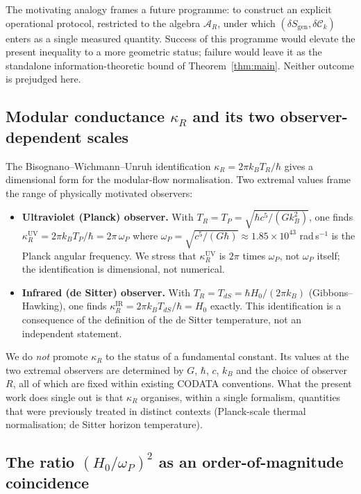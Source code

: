 \documentclass[aps,prd,superscriptaddress,nofootinbib,floatfix,10pt]{revtex4-2}
\theoremstyle{remark}
\newcommand{\Sgen}{S_{\mathrm{gen}}}
\newcommand{\kR}{\kappa_{R}}
\newcommand{\Ck}{\mathcal{C}_{k}}
\newcommand{\AR}{\mathcal{A}_{R}}
\begin{document}
The motivating analogy frames a future programme: to construct an
explicit operational protocol, restricted to the algebra $\AR$, under
which $(\delta\Sgen,\delta\Ck)$ enters as a single measured quantity.
Success of this programme would elevate the present inequality to a
more geometric status; failure would leave it as the standalone
information-theoretic bound of Theorem~\ref{thm:main}. Neither outcome
is prejudged here.

\subsection{Modular conductance $\kR$ and its two observer-dependent scales}
\label{sec:outlook:kappa}

The Bisognano--Wichmann--Unruh identification
$\kR = 2\pi k_{B} T_{R}/\hbar$ gives a dimensional form for the
modular-flow normalisation. Two extremal values frame the range of
physically motivated observers:

\begin{itemize}[leftmargin=2em,itemsep=4pt]
 \item \textbf{Ultraviolet (Planck) observer.} With $T_{R}=T_{P}=
   \sqrt{\hbar c^{5}/(G k_{B}^{2})}$, one finds
   $\kR^{\mathrm{UV}} = 2\pi k_{B} T_{P}/\hbar = 2\pi\,\omega_{P}$
   where $\omega_{P}=\sqrt{c^{5}/(G\hbar)}\approx 1.85\times 10^{43}$
   rad\,s$^{-1}$ is the Planck angular frequency. We stress that
   $\kR^{\mathrm{UV}}$ is $2\pi$ times $\omega_{P}$, not $\omega_{P}$
   itself; the identification is dimensional, not numerical.
 \item \textbf{Infrared (de Sitter) observer.} With $T_{R}=T_{dS}=
   \hbar H_{0}/(2\pi k_{B})$ (Gibbons--Hawking), one finds
   $\kR^{\mathrm{IR}} = 2\pi k_{B} T_{dS}/\hbar = H_{0}$ exactly. This
   identification is a consequence of the definition of the de Sitter
   temperature, not an independent statement.
\end{itemize}

We do \emph{not} promote $\kR$ to the status of a fundamental
constant. Its values at the two extremal observers are determined by
$G$, $\hbar$, $c$, $k_{B}$ and the choice of observer $R$, all of
which are fixed within existing CODATA conventions. What the present
work does single out is that $\kR$ organises, within a single
formalism, quantities that were previously treated in distinct
contexts (Planck-scale thermal normalisation; de Sitter horizon
temperature).

\subsection{The ratio $(H_{0}/\omega_{P})^{2}$ as an order-of-magnitude
coincidence}
\label{sec:outlook:cosmo-ratio}
\end{document}
